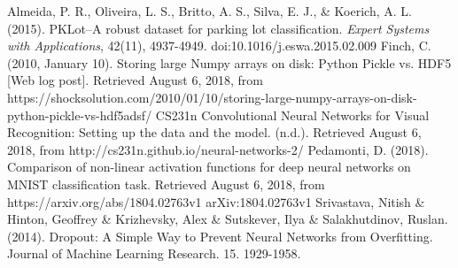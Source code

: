 \documentclass[a4paper, 11pt]{article} %
\begin{document}
\newpage
\begin{thebibliography}{unsrt}
		Almeida, P. R., Oliveira, L. S., Britto, A. S., Silva, E. J., \& Koerich, A. L. (2015). PKLot--A robust 
		dataset for parking lot classification. \textit{Expert Systems with Applications}, 42(11), 
		4937-4949. doi:10.1016/j.eswa.2015.02.009
		Finch, C. (2010, January 10). Storing large Numpy arrays on disk: 
		Python Pickle vs. HDF5 [Web log post]. Retrieved August 6, 2018, from 
		https://shocksolution.com/2010/01/10/storing-large-numpy-arrays-on-disk-python-pickle-vs-hdf5adsf/
		CS231n Convolutional Neural Networks for Visual Recognition: Setting up 
		the data and the model. (n.d.). Retrieved August 6, 2018, from 
		http://cs231n.github.io/neural-networks-2/
		Pedamonti, D. (2018). Comparison of non-linear activation functions for 
		deep neural networks on MNIST classification task. Retrieved August 6, 
		2018, from https://arxiv.org/abs/1804.02763v1 arXiv:1804.02763v1
		Srivastava, Nitish \& Hinton, Geoffrey \& Krizhevsky, Alex \& 
		Sutskever, Ilya \& Salakhutdinov, Ruslan. (2014). Dropout: A Simple Way 
		to Prevent Neural Networks from Overfitting. Journal of Machine 
		Learning Research. 15. 1929-1958.
\end{thebibliography}
\end{document}
